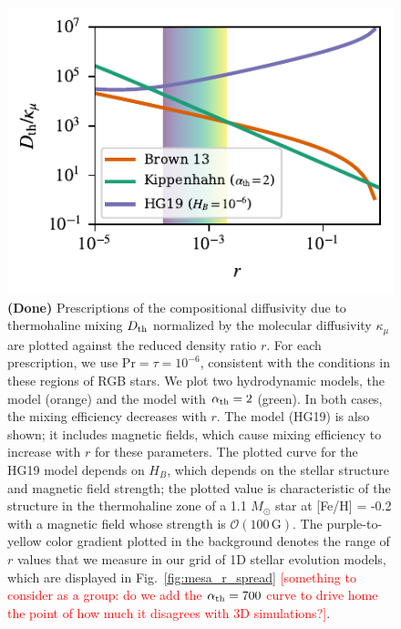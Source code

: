 \begin{figure}
    \centering
    \includegraphics[width=\columnwidth]{Nu_models_comparison.pdf}
    \caption{ {\bf{(Done)}}
    Prescriptions of the compositional diffusivity due to thermohaline mixing $D_{\rm th}$ normalized by the molecular diffusivity $\kappa_{\mu}$ are plotted against the reduced density ratio $r$. For each prescription, we use $\mathrm{Pr} = \tau = 10^{-6}$, consistent with the conditions in these regions of RGB stars.
    We plot two hydrodynamic models, the \citet{brown_etal_2013} model (orange) and the \citet{kippenhahn_etal_1980} model with $\alpha_{\rm th} = 2$ (green). In both cases, the mixing efficiency decreases with $r$.
    The \citet{harrington} model (HG19) is also shown; it includes magnetic fields, which cause mixing efficiency to increase with $r$ for these parameters.
    The plotted curve for the HG19 model depends on $H_B$, which depends on the stellar structure and magnetic field strength; the plotted value is characteristic of the structure in the thermohaline zone of a 1.1 $M_\odot$ star at [Fe/H] = -0.2 with a magnetic field whose strength is $\mathcal{O}(100 \,\mathrm{G})$.
    The purple-to-yellow color gradient plotted in the background denotes the range of $r$ values that we measure in our grid of 1D stellar evolution models, which are displayed in Fig.~\ref{fig:mesa_r_spread} \textcolor{red}{[something to consider as a group: do we add the $\alpha_{\rm{th}} = 700$ curve to drive home the point of how much it disagrees with 3D simulations?]}.
    }
    \label{fig:parameterization_compare}
\end{figure}
